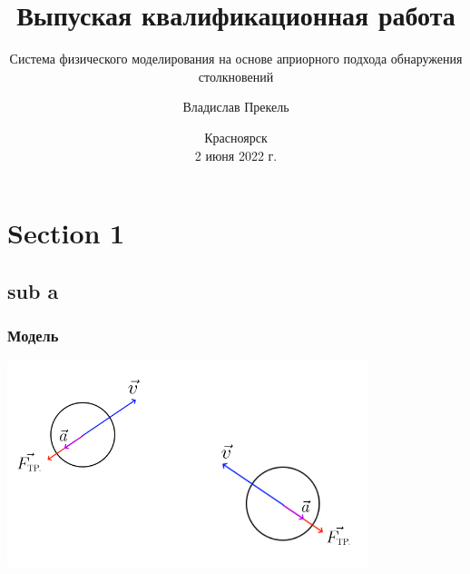 \documentclass[xetex,aspectratio=43]{beamer}
\title{Выпуская квалификационная работа}
\subtitle{Система физического моделирования на основе априорного подхода обнаружения столкновений}
\author{Владислав Прекель}
\institute{ИКИТ СФУ\\КИ18-16б}
\date{Красноярск\\2 июня 2022 г.}
\begin{document}
\begin{frame}
    \titlepage
\end{frame}

\section{Section 1}
\subsection{sub a}

\begin{frame}
    \frametitle{Модель}

    \includegraphics[height=6cm]{body_init}

\end{frame}
\end{document}
